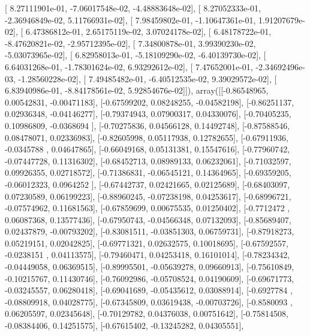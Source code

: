 \documentclass{article}
\begin{document}
       [  8.27111901e-01,  -7.06017548e-02,  -4.48883648e-02],
       [  8.27052333e-01,  -2.36946849e-02,   5.11766931e-02],
       [  7.98459802e-01,  -1.10647361e-01,   1.91207679e-02],
       [  6.47386812e-01,   2.65175119e-02,   3.07024178e-02],
       [  6.48178722e-01,  -8.47620821e-02,  -2.95712395e-02],
       [  7.34800878e-01,   3.99390230e-02,  -5.03073965e-02],
       [  6.82958013e-01,  -5.18109290e-02,  -6.40139730e-02],
       [  6.64031268e-01,  -1.78301624e-02,   6.93292612e-02],
       [  7.47652001e-01,  -2.34692496e-03,  -1.28560228e-02],
       [  7.49485482e-01,  -6.40512535e-02,   9.39029572e-02],
       [  6.83940986e-01,  -8.84178561e-02,   5.92854676e-02]]), array([[-0.86548965,  0.00542831, -0.00471183],
       [-0.67599202,  0.08248255, -0.04582198],
       [-0.86251137,  0.02936348, -0.04146277],
       [-0.79374943,  0.07900317,  0.04330076],
       [-0.70405235,  0.10986809, -0.0368694 ],
       [-0.70275836,  0.04566128,  0.14492748],
       [-0.87588546,  0.08478071,  0.02336983],
       [-0.82605998,  0.05117938,  0.12782655],
       [-0.67911936, -0.0345788 ,  0.04647865],
       [-0.66049168,  0.05131381,  0.15547616],
       [-0.77960742, -0.07447728,  0.11316302],
       [-0.68452713,  0.08989133,  0.06232061],
       [-0.71032597,  0.09926355,  0.02718572],
       [-0.71386831, -0.06545121,  0.14364965],
       [-0.69359205, -0.06012323,  0.0964252 ],
       [-0.67442737,  0.02421665,  0.02125689],
       [-0.68403097,  0.07230589,  0.06199223],
       [-0.88960245, -0.07238198,  0.04253617],
       [-0.68996721, -0.07574962,  0.11681563],
       [-0.67859699,  0.00675535,  0.01250402],
       [-0.7712472 ,  0.06087368,  0.13577436],
       [-0.67950743, -0.04566348,  0.07132093],
       [-0.85689407,  0.02437879, -0.00793202],
       [-0.83081511, -0.03851303,  0.06759731],
       [-0.87918273,  0.05219151,  0.02042825],
       [-0.69771321,  0.02632575,  0.10018695],
       [-0.67592557, -0.0238151 ,  0.04113575],
       [-0.79460471,  0.04253418,  0.16101014],
       [-0.78234342, -0.04449058,  0.06369515],
       [-0.89995501, -0.05639278,  0.09660913],
       [-0.75610849, -0.10215767,  0.11430746],
       [-0.76092986, -0.05708524,  0.04190609],
       [-0.69671773, -0.03245557,  0.06280418],
       [-0.69041689, -0.05435612,  0.03088914],
       [-0.6927784 , -0.08809918,  0.04028775],
       [-0.67345809,  0.03619438, -0.00703726],
       [-0.8580093 ,  0.06205597,  0.02345648],
       [-0.70129782,  0.04376038,  0.00751642],
       [-0.75814508, -0.08384406,  0.14251575],
       [-0.67615402, -0.13245282,  0.04305551],
\end{document}
